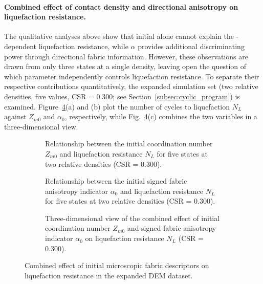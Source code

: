 \paragraph{Combined effect of contact density and directional anisotropy on liquefaction resistance.}
The qualitative analyses above show that initial \Zm{} alone cannot explain the \Kzero{}-dependent liquefaction resistance, while $\alpha$ provides additional discriminating power through directional fabric information. However, these observations are drawn from only three \Kzero{} states at a single density, leaving open the question of which parameter independently controls liquefaction resistance. To separate their respective contributions quantitatively, the expanded simulation set (two relative densities, five \Kzero{} values, CSR = 0.300; see Section~\ref{subsec:cyclic_program}) is examined. Figure~\ref{fig:fabric_liq_pair}(a) and (b) plot the number of cycles to liquefaction $N_L$ against $Z_{m0}$ and $\alpha_0$, respectively, while Fig.~\ref{fig:fabric_liq_pair}(c) combines the two variables in a three-dimensional view.

\begin{figure}
  \centering
  \begin{subfigure}[t]{0.455\textwidth}
    \centering
    \caption{Relationship between the initial coordination number $Z_{m0}$ and liquefaction resistance $N_L$ for five \Kzero{} states at two relative densities (CSR = 0.300).}
    \label{fig:fabric_liq_pair_zm}
  \end{subfigure}
  \hfill
  \begin{subfigure}[t]{0.455\textwidth}
    \centering
    \caption{Relationship between the initial signed fabric anisotropy indicator $\alpha_0$ and liquefaction resistance $N_L$ for five \Kzero{} states at two relative densities (CSR = 0.300).}
    \label{fig:fabric_liq_pair_alpha}
  \end{subfigure}

  \vspace{0.5em}

  \begin{subfigure}[t]{0.455\textwidth}
    \centering
    \caption{Three-dimensional view of the combined effect of initial coordination number $Z_{m0}$ and signed fabric anisotropy indicator $\alpha_0$ on liquefaction resistance $N_L$ (CSR = 0.300).}
    \label{fig:fabric_liq_pair_3d}
  \end{subfigure}
  \caption{Combined effect of initial microscopic fabric descriptors on liquefaction resistance in the expanded DEM dataset.}
  \label{fig:fabric_liq_pair}
\end{figure}

